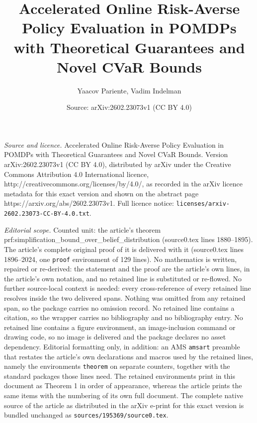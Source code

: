 \documentclass[10pt,a4paper]{amsart}
\title{Accelerated Online Risk-Averse Policy Evaluation in POMDPs with Theoretical Guarantees and Novel CVaR Bounds}
\author{Yaacov Pariente, Vadim Indelman}
\date{Source: arXiv:2602.23073v1 (CC BY 4.0)}
\begin{document}
\maketitle

\noindent\emph{Source and licence.} Accelerated Online Risk-Averse Policy Evaluation in POMDPs with Theoretical Guarantees and Novel CVaR Bounds. Version arXiv:2602.23073v1 (CC BY 4.0), distributed by arXiv under the Creative Commons Attribution 4.0 International licence, http://creativecommons.org/licenses/by/4.0/, as recorded in the arXiv licence metadata for this exact version and shown on the abstract page https://arxiv.org/abs/2602.23073v1. Full licence notice: \texttt{licenses/arxiv-2602.23073-CC-BY-4.0.txt}.\par\smallskip

\noindent\textit{Editorial scope.} Counted unit: the article's theorem prf:simplification\_bound\_over\_belief\_distribution (source0.tex lines 1880--1895). The article's complete original proof of it is delivered with it (source0.tex lines 1896--2024, one \texttt{proof} environment of 129 lines). No mathematics is written, repaired or re-derived: the statement and the proof are the article's own lines, in the article's own notation, and no retained line is substituted or re-flowed.  No further source-local context is needed: every cross-reference of every retained line resolves inside the two delivered spans.  Nothing was omitted from any retained span, so the package carries no omission record.  No retained line contains a citation, so the wrapper carries no bibliography and no bibliography entry.  No retained line contains a figure environment, an image-inclusion command or drawing code, so no image is delivered and the package declares no asset dependency.  Editorial formatting only, in addition: an AMS \texttt{amsart} preamble that restates the article's own declarations and macros used by the retained lines, namely the environments \texttt{theorem} on separate counters, together with the standard packages those lines need.  The retained environments print in this document as Theorem 1 in order of appearance, whereas the article prints the same items with the numbering of its own full document.  The complete native source of the article as distributed in the arXiv e-print for this exact version is bundled unchanged as \texttt{sources/195369/source0.tex}.
\end{document}
